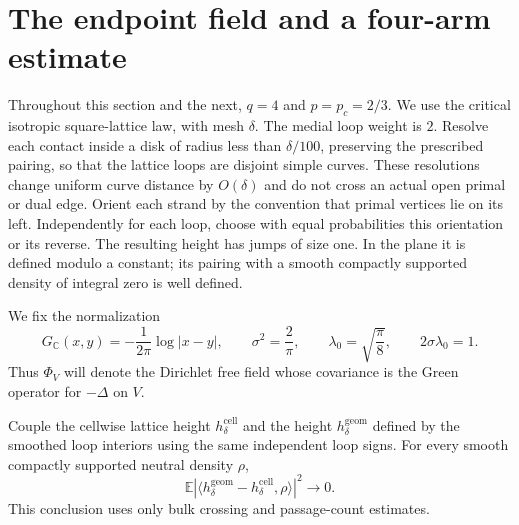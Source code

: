 \section{The endpoint field and a four-arm estimate}
\label{sec:q4tools}

Throughout this section and the next, $q=4$ and $p=p_c=2/3$.
We use the critical isotropic square-lattice law, with mesh $\delta$.
The medial loop weight is $2$.  Resolve each contact inside a disk of
radius less than $\delta/100$, preserving the prescribed pairing, so
that the lattice loops are disjoint simple curves.  These resolutions
change uniform curve distance by $O(\delta)$ and do not cross an actual
open primal or dual edge.  Orient each strand by the convention that
primal vertices lie on its left.  Independently for each loop, choose
with equal probabilities this orientation or its reverse.  The resulting
height has jumps of size one.  In the plane it is defined modulo a
constant; its pairing with a smooth compactly supported density of
integral zero is well defined.

We fix the normalization
\begin{equation}\label{q4field:normalization}
 G_{\mathbb C}(x,y)=-\frac{1}{2\pi}\log|x-y|,
 \qquad \sigma^2=\frac{2}{\pi},
 \qquad \lambda_0=\sqrt{\frac{\pi}{8}},
 \qquad 2\sigma\lambda_0=1.
\end{equation}
Thus $\Phi_V$ will denote the Dirichlet free field whose covariance is
the Green operator for $-\Delta$ on $V$.

\begin{lemma}\label{q4field:height-comparison}
Couple the cellwise lattice height $h_\delta^{\mathrm{cell}}$ and
the height $h_\delta^{\mathrm{geom}}$ defined by the smoothed loop
interiors using the same independent loop signs.  For every smooth
compactly supported neutral density $\rho$,
\begin{equation}\label{q4field:height-comparison-L2}
 \mathbb E\left|
   \langle h_\delta^{\mathrm{geom}}
          -h_\delta^{\mathrm{cell}},\rho\rangle\right|^2
 \longrightarrow0.
\end{equation}
This conclusion uses only bulk crossing and passage-count estimates.
\end{lemma}

